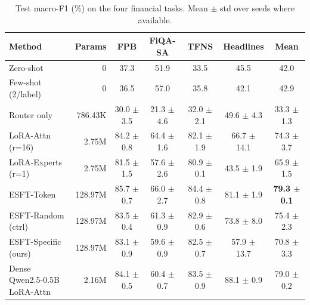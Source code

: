 \begin{table}[t]
\centering
\caption{Test macro-F1 (\%) on the four financial tasks. Mean $\pm$ std over seeds where available.}
\label{tab:main}
\begin{tabular}{l r c c c c c}
\toprule
\textbf{Method} & \textbf{Params} & \textbf{FPB} & \textbf{FiQA-SA} & \textbf{TFNS} & \textbf{Headlines} & \textbf{Mean} \\
\midrule
Zero-shot & 0 & 37.3 & 51.9 & 33.5 & 45.5 & 42.0 \\
Few-shot (2/label) & 0 & 36.5 & 57.0 & 35.8 & 42.1 & 42.9 \\
Router only & 786.43K & 30.0 $\pm$ 3.5 & 21.3 $\pm$ 4.6 & 32.0 $\pm$ 2.1 & 49.6 $\pm$ 4.3 & 33.3 $\pm$ 1.3 \\
LoRA-Attn (r=16) & 2.75M & 84.2 $\pm$ 0.8 & 64.4 $\pm$ 1.6 & 82.1 $\pm$ 1.9 & 66.7 $\pm$ 14.1 & 74.3 $\pm$ 3.7 \\
LoRA-Experts (r=1) & 2.75M & 81.5 $\pm$ 1.5 & 57.6 $\pm$ 2.6 & 80.9 $\pm$ 0.1 & 43.5 $\pm$ 1.9 & 65.9 $\pm$ 1.5 \\
ESFT-Token & 128.97M & 85.7 $\pm$ 0.7 & 66.0 $\pm$ 2.7 & 84.4 $\pm$ 0.8 & 81.1 $\pm$ 1.9 & \textbf{79.3 $\pm$ 0.1} \\
ESFT-Random (ctrl) & 128.97M & 83.5 $\pm$ 0.4 & 61.3 $\pm$ 0.9 & 82.9 $\pm$ 0.6 & 73.8 $\pm$ 8.0 & 75.4 $\pm$ 2.3 \\
ESFT-Specific (ours) & 128.97M & 83.1 $\pm$ 0.9 & 59.6 $\pm$ 0.9 & 82.5 $\pm$ 0.7 & 57.9 $\pm$ 13.7 & 70.8 $\pm$ 3.3 \\
Dense Qwen2.5-0.5B LoRA-Attn & 2.16M & 84.1 $\pm$ 0.5 & 60.4 $\pm$ 0.7 & 83.5 $\pm$ 0.9 & 88.1 $\pm$ 0.9 & 79.0 $\pm$ 0.2 \\
\bottomrule
\end{tabular}
\end{table}